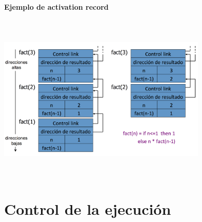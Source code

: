 \documentclass[10pt,a4paper]{report}
\begin{document}
\subsubsection{Ejemplo de activation record}

\begin{center} 	
		\includegraphics[width=10cm, height=8cm]{factorial.png}
\end{center}


\chapter{Control de la ejecución}
\end{document}
